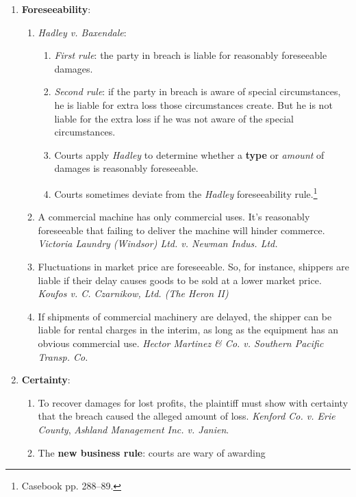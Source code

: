 \begin{enumerate}
    \item \textbf{Foreseeability}:
    \begin{enumerate}
        \item \emph{Hadley v. Baxendale}:
        \begin{enumerate}
            \item \emph{First rule}: the party in breach is liable for 
            reasonably foreseeable damages.
            \item \emph{Second rule}: if the party in breach is aware of 
            special circumstances, he is liable for extra loss those 
            circumstances create. But he is not liable for the extra loss if 
            he was not aware of the special circumstances.
            \item Courts apply \emph{Hadley} to determine whether a 
            \textbf{type} or \emph{amount} of damages is reasonably 
            foreseeable.
            \item Courts sometimes deviate from the \emph{Hadley} 
            foreseeability rule.\footnote{Casebook pp. 288--89.}
        \end{enumerate}
        \item A commercial machine has only commercial uses. It's reasonably 
        foreseeable that failing to deliver the machine will hinder commerce. 
        \emph{Victoria Laundry (Windsor) Ltd. v. Newman Indus. Ltd.}
        \item Fluctuations in market price are foreseeable. So, for instance, 
        shippers are liable if their delay causes goods to be sold at a lower 
        market price. \emph{Koufos v. C. Czarnikow, Ltd. (The Heron II)}
        \item If shipments of commercial machinery are delayed, the shipper 
        can be liable for rental charges in the interim, as long as the 
        equipment has an obvious commercial use. \emph{Hector Martinez \& Co. 
        v. Southern Pacific Transp. Co.}
    \end{enumerate}
    \item \textbf{Certainty}:
    \begin{enumerate}
        \item To recover damages for lost profits, the plaintiff must show 
        with certainty that the breach caused the alleged amount of loss. 
        \emph{Kenford Co. v. Erie County}, \emph{Ashland Management Inc. v. 
        Janien}.
        \item The \textbf{new business rule}: courts are wary of awarding 

\end{enumerate}
\end{enumerate}
